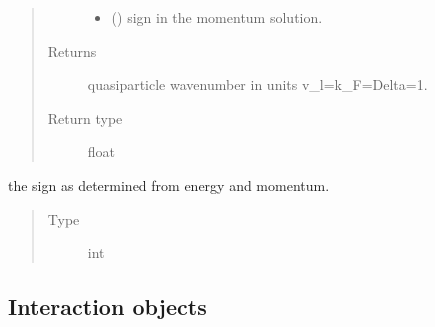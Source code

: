 \documentclass[letterpaper,10pt,english]{sphinxmanual}
\begin{document}
\begin{fulllineitems}
\begin{fulllineitems}
\begin{quote}
\begin{description}
\begin{itemize}
\item {} 
 (\sphinxstyleliteralemphasis{\sphinxupquote{, }}) \textendash{} sign in the momentum solution.

\end{itemize}

\item[{Returns}] \leavevmode
quasiparticle wavenumber in units v\_l=k\_F=Delta=1.

\item[{Return type}] \leavevmode
float

\end{description}\end{quote}

\end{fulllineitems}


\begin{fulllineitems}
\label{\detokenize{code_structure:scdc.particle.Quasiparticle.ksign}}
the sign as determined from energy and momentum.
\begin{quote}\begin{description}
\item[{Type}] \leavevmode
int

\end{description}\end{quote}

\end{fulllineitems}


\end{fulllineitems}



\subsection{Interaction objects}
\label{\detokenize{code_structure:module-scdc.interaction}}\label{\detokenize{code_structure:interaction-objects}}
\end{document}
